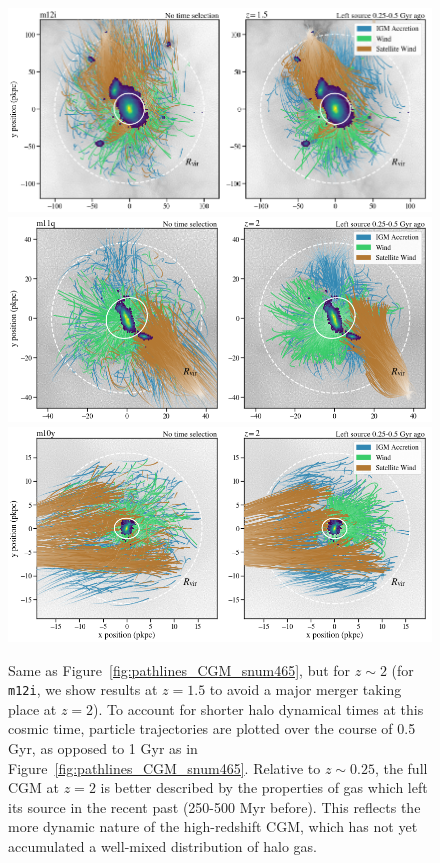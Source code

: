 \documentclass[fleqn,usenatbib]{mnras}
\begin{document}
\begin{figure}
\centering
\includegraphics[height=0.29\textheight]{figures/streamlines_m12i_CGM_snum214_galdefv3.png}
\includegraphics[height=0.29\textheight]{figures/streamlines_m11q_CGM_snum172_galdefv3.png}
\includegraphics[height=0.305\textheight]{figures/streamlines_m10y_CGM_snum172_galdefv3.png}
\caption{
Same as Figure~\ref{fig:pathlines_CGM_snum465}, but for $z\sim2$ (for \texttt{m12i}, we show results at $z=1.5$ to avoid a major merger taking place at $z=2$).
To account for shorter halo dynamical times at this cosmic time, particle trajectories are plotted over the course of 0.5 Gyr, as opposed to 1 Gyr as in Figure~\ref{fig:pathlines_CGM_snum465}. 
Relative to $z\sim 0.25$, the full CGM at $z=2$ is better described by the properties of gas which left its source in the recent past (250-500 Myr before). 
This reflects the more dynamic nature of the high-redshift CGM, which has not yet accumulated a well-mixed distribution of halo gas.
}
\label{fig:pathlines_CGM_snum172}
\end{figure}
\end{document}
